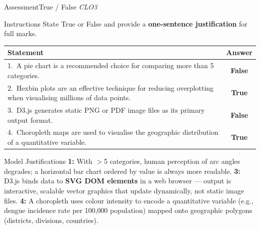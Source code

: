 \documentclass[aspectratio=169,10pt]{beamer}
\begin{document}
\begin{frame}{Assessment\textemdash True / False \hfill\small\textit{CLO3}}
  \begin{block}{Instructions}
    State True or False and provide a \textbf{one-sentence justification} for full marks.
  \end{block}
  \vspace{4pt}
  \centering
  \renewcommand{\arraystretch}{1.6}
  \begin{tabular}{p{9.0cm}c}
    \toprule
    \textbf{Statement} & \textbf{Answer} \\
    \midrule
    1.\ A pie chart is a recommended choice for comparing more than 5 categories. &
    \alert{\textbf{False}} \\
    2.\ Hexbin plots are an effective technique for reducing overplotting when visualising millions of data points. &
    \textbf{True} \\
    3.\ D3.js generates static PNG or PDF image files as its primary output format. &
    \alert{\textbf{False}} \\
    4.\ Choropleth maps are used to visualise the geographic distribution of a quantitative variable. &
    \textbf{True} \\
    \bottomrule
  \end{tabular}
  \vspace{6pt}
  \begin{exampleblock}{Model Justifications}
    \small \textbf{1:} With $>$5 categories, human perception of arc angles degrades; a horizontal bar chart ordered by value is always more readable.  \textbf{3:} D3.js binds data to \textbf{SVG DOM elements} in a web browser --- output is interactive, scalable vector graphics that update dynamically, not static image files.  \textbf{4:} A choropleth uses colour intensity to encode a quantitative variable (e.g., dengue incidence rate per 100{,}000 population) mapped onto geographic polygons (districts, divisions, countries).
  \end{exampleblock}
\end{frame}
\end{document}
